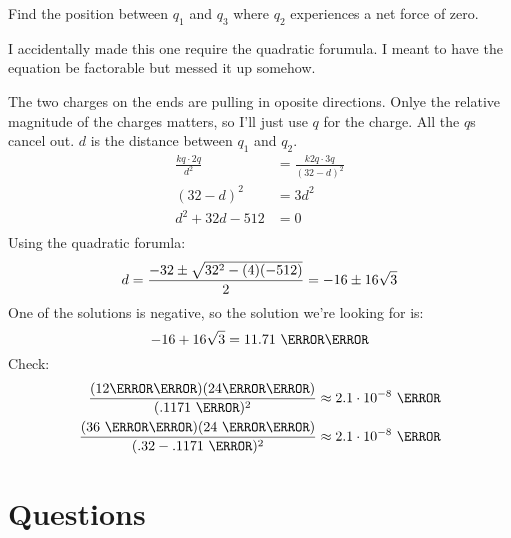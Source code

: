 \documentclass{exam}
\begin{document}
Find the position between $q_1$ and $q_3$ where $q_2$ experiences a net force of zero.

\begin{solution}
I accidentally made this one require the quadratic forumula.  I meant to have the equation be factorable but messed it up somehow.

The two charges on the ends are pulling in oposite directions.  Onlye the relative magnitude of the charges matters, so
I'll just use $q$ for the charge.  All the $q$s cancel out.  $d$ is the distance between $q_1$ and $q_2$.
\begin{align*}
  \frac{k q \cdot 2q}{d^2} &=   \frac{k 2q \cdot 3q}{(32 -d)^2} \\
  (32 - d)^2 &= 3d^2 \\
  d^2 + 32d - 512 &= 0 \\
\end{align*}
Using the quadratic forumla:
\[
 d = \frac{-32 \pm \sqrt{32^2 - (4)(-512)}}{2} = -16 \pm 16 \sqrt{3} \\
\]
One of the solutions is negative, so the solution we're looking for is: 
\[
  -16 + 16 \sqrt{3} = 11.71 \ \centi\meter
\]
Check:
\begin{align*}
  \frac{(12 \micro\coulomb) (24 \micro\coulomb)}{(.1171 \ \meter)^2} &\approx 2.1 \cdot 10^{-8} \ \newton \\
  \frac{(36 \ \micro\coulomb) (24 \ \micro\coulomb)}{(.32 - .1171 \ \meter)^2} &\approx 2.1 \cdot 10^{-8} \ \newton
\end{align*}

\end{solution}

\ifprintanswers
\pagebreak
\section{Questions}
\end{document}
